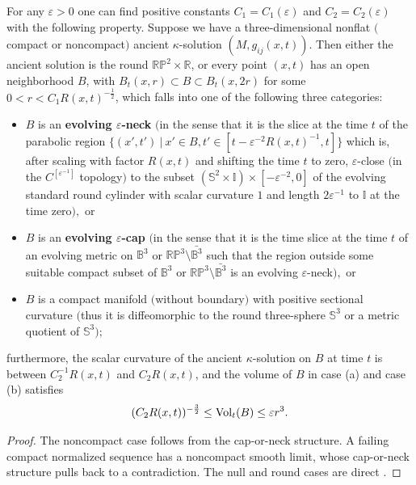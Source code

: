 \begin{theorem}
  \label{thm:cz-ancient-kappa-canonical-neighborhoods}
 For any $\varepsilon>0$ one can find
positive constants $C_1=C_1(\varepsilon)$ and
$C_2=C_2(\varepsilon)$ with the following property. Suppose we
have a three-dimensional nonflat $($compact or noncompact$)$
ancient $\kappa$-solution $(M,g_{ij}(x,t))$. Then either the
ancient solution is the round $\mathbb{R}\mathbb{P}^2 \times
\mathbb{R}$, or every point $(x,t)$ has an open neighborhood $B$,
with $B_t(x,r)\subset B \subset B_t(x,2r)$ for some
$0<r<C_1R(x,t)^{-\frac{1}{2}}$, which falls into one of the
following three categories:
\begin{itemize}
\item[(a)] $B$ is an {\bf evolving $\varepsilon$-neck} $($in the
sense that it is the slice at the time $t$ of the parabolic region
$\{(x',t')\ |\ x' \in B, t' \in [t - \varepsilon^{-2}R(x,t)^{-1},
t] \}$ which is, after scaling with factor $R(x,t)$ and shifting
the time $t$ to zero, $\varepsilon$-close $($in the
$C^{[\varepsilon^{-1}]}$ topology$)$ to the subset
$(\mathbb{S}^2\times \mathbb{I})\times [-\varepsilon^{-2},0]$ of
the evolving standard round cylinder with scalar curvature $1$ and
length $2\varepsilon^{-1}$ to $\mathbb{I}$ at the time zero$),$ or
 \item[(b)] $B$ is an {\bf
evolving $\varepsilon$-cap} $($in the sense that it is the time
slice at the time $t$ of an evolving metric on $\mathbb{B}^3$ or
$\mathbb{R}\mathbb{P}^3\setminus\bar{\mathbb{B}^3}$ such that the
region outside some suitable compact subset of $\mathbb{B}^3$ or
$\mathbb{R}\mathbb{P}^3\setminus\bar{\mathbb{B}^3}$ is an evolving
$\varepsilon$-neck$),$ or 
\item[(c)] $B$ is a compact manifold $($without boundary$)$ with
positive sectional curvature $($thus it is diffeomorphic to the
round three-sphere $\mathbb{S}^3$ or a metric quotient of
$\mathbb{S}^3);$
\end{itemize}
furthermore, the scalar curvature of the ancient $\kappa$-solution
on $B$ at time $t$ is between $C_2^{-1}R(x,t)$ and $C_2R(x,t)$,
and the volume of $B$ in case {\rm (a)} and case {\rm (b)}
satisfies
$$
(C_2R(x,t))^{-\frac{3}{2}} \leq \operatorname{Vol}_t(B) \leq \varepsilon r^3.
$$
\end{theorem}
\begin{proof}
\sketch The noncompact case follows from the cap-or-neck structure.
A failing compact normalized sequence has a noncompact smooth limit,
whose cap-or-neck structure pulls back to a contradiction.  The null
and round cases are direct \cite{P2, CZ05F}.
\end{proof}
